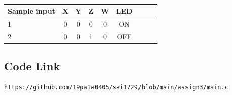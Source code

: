 \documentclass[10pt, a4paper]{article}
\begin{document}
\begin{table}[htbp]
 \begin{center}
    \begin{tabular}{|l|c|c|c|c|c|c|c|c} \hline \textbf{Sample input}
  & \textbf{X} & \textbf{Y} & \textbf{Z}& \textbf{W}& \textbf{LED } \\
 \hline
1&0&0&0&0&ON\\ \hline
2&0&0&1&0&OFF \\ \hline
\end{tabular}   
\end{center}
\caption{\label{table:dummytable} }
\end{table}

\subsection{Code Link}
\vspace{5mm}
\begin{lstlisting}
https://github.com/19pa1a0405/sai1729/blob/main/assign3/main.c
\end{lstlisting}
\end{document}
